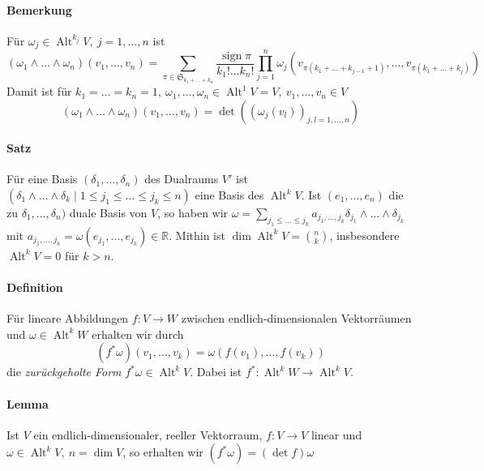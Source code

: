\documentclass[12pt,a4paper,fleqn]{article}
\def\R{{\mathbb{R}}}
\begin{document}
\paragraph{Bemerkung} Für $\omega_j \in \operatorname{Alt}^{k_j} V,\ j = 1, \dots, n$ ist
\begin{displaymath}
(\omega_1\wedge \dots\wedge \omega_n)(v_1, \dots, v_n) = \sum_{\pi \in \mathfrak{S}_{k_1+\dots +k_n}} \frac{\operatorname{sign}\pi}{k_1!\dots k_n!} \prod_{j=1}^n \omega_j (v_{ \pi(k_1+\dots +k_{j-1}+1)}, \dots, v_{\pi(k_1+\dots+k_j)})
\end{displaymath}
Damit ist für $k_1 = \dots = k_n = 1,\ \omega_1, \dots, \omega_n \in \operatorname{Alt}^1 V = V,\ v_1, \dots, v_n \in V$
\begin{displaymath}
(\omega_1\wedge\dots\wedge\omega_n)(v_1, \dots, v_n) = \det ((\omega_j(v_l))_{j, l = 1, \dots, n})
\end{displaymath}

\paragraph{Satz} Für eine Basis $(\delta_1, \dots, \delta_n)$ des Dualraums $V'$ ist ${(\delta_1\wedge\dots\wedge\delta_k \mid 1\leq j_1\leq\dots\leq j_k \leq n)}$ eine Basis des $\operatorname{Alt}^k V$. 
Ist $(e_1, \dots, e_n)$ die zu $\delta_1, \dots, \delta_n)$ duale Basis von $V$, so haben wir $\omega = \sum_{j_1\leq \dots\leq j_k} a_{j_1, \dots, j_k} \delta_{j_1}\wedge\dots\wedge\delta_{j_k}$ mit $a_{j_1, \dots, j_k} = \omega(e_{j_1}, \dots, e_{j_k})\in \R$. 
Mithin ist $\dim\operatorname{Alt}^k V = \binom{n}{k}$, insbesondere $\operatorname{Alt}^k V = 0$ für $k > n$.

\paragraph{Definition} Für lineare Abbildungen $f\colon V \rightarrow W$ zwischen endlich-dimensionalen Vektorräumen und $\omega \in \operatorname{Alt}^k W$ erhalten wir durch 
\begin{displaymath}
(f^\ast\omega)(v_1, \dots, v_k) = \omega(f(v_1), \dots, f(v_k))
\end{displaymath}
die \textit{zurückgeholte Form} $f^\ast\omega \in \operatorname{Alt}^k V$. Dabei ist $f^\ast\colon \operatorname{Alt}^k W \rightarrow \operatorname{Alt}^k V$.

\paragraph{Lemma} Ist $V$ ein endlich-dimensionaler, reeller Vektorraum, $f\colon V \rightarrow V$ linear und $\omega \in \operatorname{Alt}^k V,\ n = \dim V$, so erhalten wir $(f^\ast\omega) = (\det f)\omega$
\end{document}
